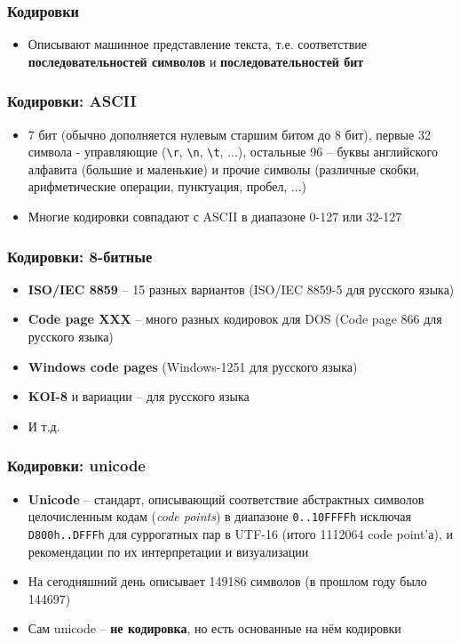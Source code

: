 \documentclass{beamer}
\begin{document}
\begin{frame}[fragile]
\frametitle{Кодировки}
\begin{itemize}
\item Описывают машинное представление текста, т.е. соответствие \alert{\textbf{последовательностей символов}} и \alert{\textbf{последовательностей бит}}
\end{itemize}
\end{frame}

\begin{frame}[fragile]
\frametitle{Кодировки: ASCII}
\begin{itemize}
\item 7 бит (обычно дополняется нулевым старшим битом до 8 бит), первые 32 символа - управляющие (\verb|\r|, \verb|\n|, \verb|\t|, ...), остальные 96 -- буквы английского алфавита (большие и маленькие) и прочие символы (различные скобки, арифметические операции, пунктуация, пробел, ...)
\pause
\item Многие кодировки совпадают с ASCII в диапазоне 0-127 или 32-127
\end{itemize}
\end{frame}

\begin{frame}[fragile]
\frametitle{Кодировки: 8-битные}
\begin{itemize}
\item \textbf{ISO/IEC 8859} -- 15 разных вариантов (ISO/IEC 8859-5 для русского языка)
\pause
\item \textbf{Code page XXX} -- много разных кодировок для DOS (Code page 866 для русского языка)
\pause
\item \textbf{Windows code pages} (Windows-1251 для русского языка)
\pause
\item \textbf{KOI-8} и вариации -- для русского языка
\pause
\item И т.д.
\end{itemize}
\end{frame}

\begin{frame}[fragile]
\frametitle{Кодировки: unicode}
\begin{itemize}
\item \textbf{Unicode} -- стандарт, описывающий соответствие абстрактных символов целочисленным кодам (\textit{code points}) в диапазоне \verb|0..10FFFFh| исключая \verb|D800h..DFFFh| для суррогатных пар в UTF-16 (итого 1112064 code point'а), и рекомендации по их интерпретации и визуализации
\pause
\item На сегодняшний день описывает 149186 символов (в прошлом году было 144697)
\pause
\item Сам unicode -- \textbf{не кодировка}, но есть основанные на нём кодировки
\end{itemize}
\end{frame}
\end{document}
